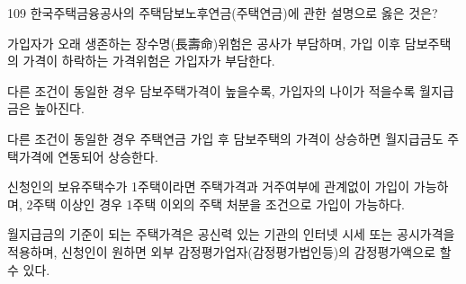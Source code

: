 \begin{question}{109}
한국주택금융공사의 주택담보노후연금(주택연금)에 관한 설명으로 옳은 것은?
\begin{choices}
  \item 가입자가 오래 생존하는 장수명(長壽命)위험은 공사가 부담하며, 가입 이후 담보주택의 가격이 하락하는 가격위험은 가입자가 부담한다.
  \item 다른 조건이 동일한 경우 담보주택가격이 높을수록, 가입자의 나이가 적을수록 월지급금은 높아진다.
  \item 다른 조건이 동일한 경우 주택연금 가입 후 담보주택의 가격이 상승하면 월지급금도 주택가격에 연동되어 상승한다.
  \item 신청인의 보유주택수가 1주택이라면 주택가격과 거주여부에 관계없이 가입이 가능하며, 2주택 이상인 경우 1주택 이외의 주택 처분을 조건으로 가입이 가능하다.
  \item 월지급금의 기준이 되는 주택가격은 공신력 있는 기관의 인터넷 시세 또는 공시가격을 적용하며, 신청인이 원하면 외부 감정평가업자(감정평가법인등)의 감정평가액으로 할 수 있다.
\end{choices}
\end{question}
